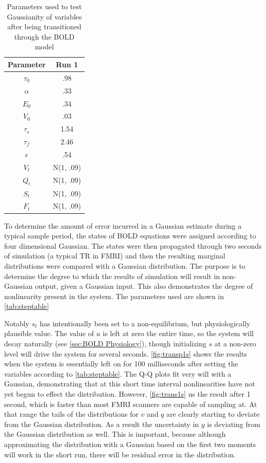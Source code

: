 \begin{table}[t]
\centering
\begin{tabular}{|c || c |}
\hline 
Parameter & Run 1 \\
\hline
$\tau_0$ & .98  \\
$\alpha$ & .33 \\
$E_0$ & .34  \\
$V_0$ & .03  \\
$\tau_s$ & 1.54  \\
$\tau_f$ & 2.46  \\
$\epsilon$ & .54  \\
$V_t$ & N(1, .09)  \\
$Q_t$ & N(1, .09)  \\
$S_t$ & N(1, .09) \\
$F_t$ & N(1, .09) \\
\hline
\end{tabular}
\caption{Parameters used to test Gaussianity of variables after being transitioned through
the BOLD model}
\label{tab:steptable} 
\end{table}

To determine the amount of error incurred in a Gaussian estimate during
a typical sample period, the states of BOLD equations were assigned according
to four dimensional Gaussian. The states were then propagated through two
seconds of simulation (a typical TR in FMRI) and then the resulting
marginal distributions were compared with a Gaussian distribution. The 
purpose is to determine the degree to which the results of simulation will
result in non-Gaussian output, given a Gaussian input. This also demonstrates
the degree of nonlinearity present in the system. The parameters used are 
shown in \autoref{tab:steptable}

Notably $s_t$ has intentionally been set to a non-equilibrium, but physiologically
plausible value. The value of $u$ is left at zero the entire time, so the 
system will decay naturally (see \autoref{sec:BOLD Physiology}), though initializing 
$s$ at a non-zero level will drive the system for several seconds. 
\autoref{fig:transp1s} shows the results when the system is essentially
left on for 100 milliseconds after setting the variables according to \autoref{tab:steptable}.
The Q-Q plots fit very will with a Gaussian, demonstrating that at this short
time interval nonlinearities have not yet begun to effect the distribution.
However, \autoref{fig:trans1s} us the result after 1 second, which is faster
than most FMRI scanners are capable of sampling at. At that range the tails 
of the distributions for $v$ and $q$ are clearly starting to deviate from the
Gaussian distribution. As a result the uncertainty in $y$ is deviating from
the Gaussian distribution as well. This is important, because although 
approximating the distribution with a Gaussian based on the first two
moments will work in the short run, there will be residual error in the
distribution. 

